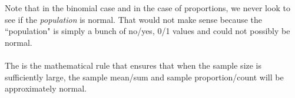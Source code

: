 \\
\\Note that in the binomial case and in the case of proportions, we never look to see if the \emph{population} is normal.  That would not make sense because the ``population" is simply a bunch of no/yes, 0/1 values and could not possibly be normal.
\\
\\The {} is the mathematical rule that ensures that when the sample size is sufficiently large, the sample mean/sum and sample proportion/count will be approximately normal.  

